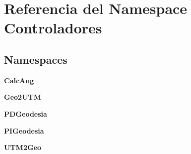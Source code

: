 \section{Referencia del Namespace Controladores}
\label{namespaceControladores}
\subsection*{Namespaces}
\begin{DoxyCompactItemize}
\item 
{\bf Calc\-Ang}
\item 
{\bf Geo2\-U\-T\-M}
\item 
{\bf P\-D\-Geodesia}
\item 
{\bf P\-I\-Geodesia}
\item 
{\bf U\-T\-M2\-Geo}
\end{DoxyCompactItemize}
